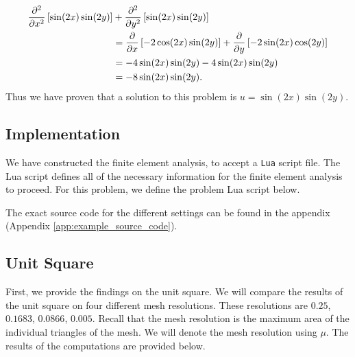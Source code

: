 \documentclass[../fem.tex]{subfile}
\begin{document}
\begin{align*}
  \frac{\partial^2 }{\partial {x}^2}\left[\sin(2x)\sin(2y)\right]&+\frac{\partial^2 }{\partial {y}^2}\left[\sin(2x)\sin(2y)\right]\\
                                          &=\frac{\partial }{\partial x}\left[-2\cos(2x)\sin(2y)\right]+\frac{\partial }{\partial y}\left[-2\sin(2x)\cos(2y)\right]\\
                                          &=-4\sin(2x)\sin(2y)-4\sin(2x)\sin(2y)\\
                                          &=-8\sin(2x)\sin(2y).
\end{align*}
Thus we have proven that a solution to this problem is $u=\sin(2x)\sin(2y)$.

\subsection{Implementation}%
\label{sub:implementation}

We have constructed the finite element analysis, to accept a \texttt{Lua}
script file. The Lua script defines all of the necessary information for the
finite element analysis to proceed. For this problem, we define the problem Lua
script below.


The exact source code for the different settings can be found in the
appendix (Appendix \ref{app:example_source_code}).

\subsection{Unit Square}%
\label{sub:unit_square}

First, we provide the findings on the unit square. We will compare the results
of the unit square on four different mesh resolutions. These resolutions are
$0.25$, $0.1683$, $0.0866$, $0.005$. Recall that the mesh resolution is the maximum
area of the individual triangles of the mesh. We will denote the mesh
resolution using $\mu$. The results of the computations are provided below.
\end{document}
